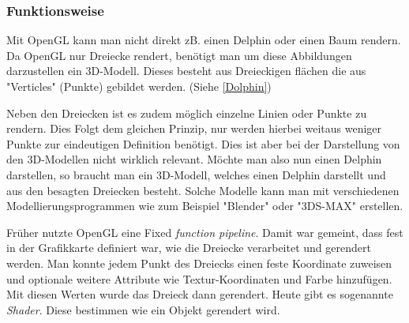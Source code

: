 \subsubsection{Funktionsweise}

Mit OpenGL kann man nicht direkt zB. einen Delphin oder einen Baum rendern. Da OpenGL nur Dreiecke  rendert, benötigt man um diese Abbildungen darzustellen ein 3D-Modell. Dieses besteht aus Dreieckigen flächen die aus "Verticles" (Punkte) gebildet werden. (Siehe \cref{Dolphin})

Neben den Dreiecken ist es zudem möglich einzelne Linien oder Punkte zu rendern. Dies Folgt dem gleichen Prinzip, nur werden hierbei weitaus weniger Punkte zur eindeutigen Definition benötigt. Dies ist aber bei der Darstellung von den 3D-Modellen nicht wirklich relevant. 
Möchte man also nun einen Delphin darstellen, so braucht man ein 3D-Modell, welches einen Delphin darstellt und aus den besagten Dreiecken besteht. Solche Modelle kann man mit verschiedenen Modellierungsprogrammen wie zum Beispiel "Blender" oder "3DS-MAX" erstellen.

Früher nutzte OpenGL eine Fixed \textit{function pipeline}. Damit war gemeint, dass fest in der Grafikkarte definiert war, wie die Dreiecke verarbeitet und gerendert werden. Man konnte jedem Punkt des Dreiecks einen feste Koordinate %
zuweisen und optionale weitere Attribute wie Textur-Koordinaten und Farbe hinzufügen. Mit diesen Werten wurde das Dreieck dann gerendert. Heute gibt es sogenannte \textit{Shader}. Diese bestimmen wie ein Objekt gerendert wird. 